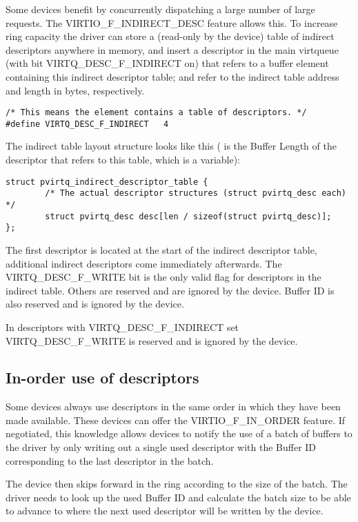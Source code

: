 Some devices benefit by concurrently dispatching a large number
of large requests. The VIRTIO_F_INDIRECT_DESC feature allows this. To increase
ring capacity the driver can store a (read-only by the device) table of indirect
descriptors anywhere in memory, and insert a descriptor in the main
virtqueue (with  bit VIRTQ_DESC_F_INDIRECT on) that refers to
a buffer element
containing this indirect descriptor table;  and 
refer to the indirect table address and length in bytes,
respectively.
\begin{lstlisting}
/* This means the element contains a table of descriptors. */
#define VIRTQ_DESC_F_INDIRECT   4
\end{lstlisting}

The indirect table layout structure looks like this
( is the Buffer Length of the descriptor that refers to this table,
which is a variable):

\begin{lstlisting}
struct pvirtq_indirect_descriptor_table {
        /* The actual descriptor structures (struct pvirtq_desc each) */
        struct pvirtq_desc desc[len / sizeof(struct pvirtq_desc)];
};
\end{lstlisting}

The first descriptor is located at the start of the indirect
descriptor table, additional indirect descriptors come
immediately afterwards. The VIRTQ_DESC_F_WRITE  bit is the
only valid flag for descriptors in the indirect table. Others
are reserved and are ignored by the device.
Buffer ID is also reserved and is ignored by the device.

In descriptors with VIRTQ_DESC_F_INDIRECT set VIRTQ_DESC_F_WRITE
is reserved and is ignored by the device.

\subsection{In-order use of descriptors}
\label{sec:Packed Virtqueues / In-order use of descriptors}

Some devices always use descriptors in the same order in which
they have been made available. These devices can offer the
VIRTIO_F_IN_ORDER feature. If negotiated, this knowledge allows
devices to notify the use of a batch of buffers to the driver by
only writing out a single used descriptor with the Buffer ID
corresponding to the last descriptor in the batch.

The device then skips forward in the ring according to the size of
the batch. The driver needs to look up the used Buffer ID and
calculate the batch size to be able to advance to where the next
used descriptor will be written by the device.

